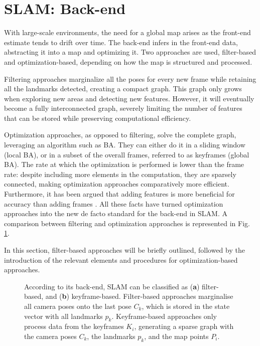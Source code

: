 \section{SLAM: Back-end}
\label{sec:backend}
With large-scale environments, the need for a global map arises as the front-end estimate tends to drift over time.
The back-end infers in the front-end data, abstracting it into a map and optimizing it. Two approaches are used, filter-based and optimization-based, depending on how the map is structured and processed.

Filtering approaches marginalize all the poses for every new frame while retaining all the landmarks detected, creating a compact graph. This graph only grows when exploring new areas and detecting new features. However, it will eventually become a fully interconnected graph, severely limiting the number of features that can be stored while preserving computational efficiency. 

Optimization approaches, as opposed to filtering, solve the complete graph, leveraging an algorithm such as \ac{BA}. They can either do it in a sliding window (local \ac{BA}), or in a subset of the overall frames, referred to as keyframes (global \ac{BA}). The rate at which the optimization is performed is lower than the frame rate: despite including more elements in the computation, they are sparsely connected, making optimization approaches comparatively more efficient.
Furthermore, it has been argued that adding features is more beneficial for accuracy than adding frames \cite{strasdat2010whyfilteristhequestion}. All these facts have turned optimization approaches into the new de facto standard for the back-end in SLAM. A comparison between filtering and optimization approaches is represented in Fig. \ref{fig:filtervsopt}.

In this section, filter-based approaches will be briefly outlined, followed by the introduction of the relevant elements and procedures for optimization-based approaches.


\begin{figure}[!b]
 \centering

\quad
{}

\caption[The SLAM back-end for filter-based and keyframe-based SLAM]{According to its back-end, SLAM can be classified as (\textbf{a}) filter-based, and  (\textbf{b}) keyframe-based. Filter-based approaches marginalise all camera poses onto the last pose $C_k$, which is stored in the state vector with all landmarks $p_k$. Keyframe-based approaches only process data from the keyframes $K_i$, generating a sparse graph with the camera poses $C_k$, the landmarks $p_k$, and the map points $P_i$.}
\centering
\label{fig:filtervsopt}
\end{figure}



